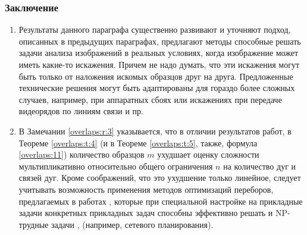 \subsubsection{Заключение}
\begin{enumerate}
\item Результаты данного параграфа существенно развивают и уточняют подход, описанных в предыдущих параграфах,  предлагают методы способные решать задачи анализа изображений в реальных условиях, когда  изображение может иметь  какие-то искажения. Причем не надо думать, что эти искажения могут быть только от наложения искомых образцов друг на друга. Предложенные технические решения могут быть адаптированы для гораздо более сложных случаев, например, при аппаратных сбоях или искажениях при передаче видеорядов по линиям связи и пр.
\item В Замечании  \ref{overlaps:r:3}  указывается, что в отличии результатов работ\cite{D8,D19,scaleline}, в Теореме \ref{overlaps:t:4} (и в Теореме \ref{overlaps:t:5}, также, формула \ref{overlaps:11}) количество образцов  $m$  ухудшает оценку сложности мультипликативно относительно общего ограничения  $n$  на количество дуг и связей дуг. Кроме соображений, что это ухудшение только линейное, следует учитывать возможность применения методов оптимизаций переборов, предлагаемых в работах \cite{Hentenrick,D15}, которые при специальной настройке на прикладные задачи конкретных прикладных задач способны эффективно решать и  NP-трудные задачи \cite{D11, D2},  (например, сетевого планирования). 
\end{enumerate}
 
